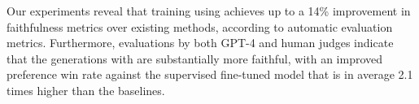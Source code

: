 Our experiments reveal that training using \scope achieves up to a 14\% improvement in faithfulness metrics over existing methods, according to automatic evaluation metrics. Furthermore, evaluations by both GPT-4 and human judges indicate that the generations with \scope are substantially more faithful, with an improved preference win rate against the supervised fine-tuned model that is in average 2.1 times higher than the baselines.




